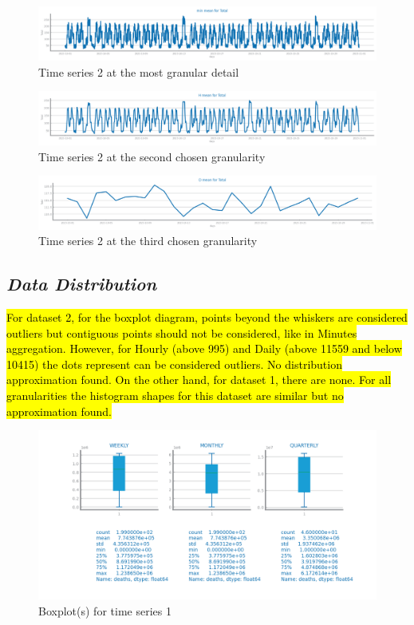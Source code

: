 \documentclass[10pt]{extarticle}
\newcommand{\ctext}[3][RGB]{%
  \begingroup
  \definecolor{hlcolor}{#1}{#2}\sethlcolor{hlcolor}%
  \hl{#3}%
  \endgroup
}
\begin{document}
\begin{figure}[H]
\centering\includegraphics[scale=0.5]{images/dataset2/time_series/fts_granularity_min.png}
\caption{Time series 2 at the most granular detail}
\end{figure}

\begin{figure}[H]
\centering\includegraphics[scale=0.5]{images/dataset2/time_series/fts_granularity_H.png}
\caption{Time series 2 at the second chosen granularity}
\end{figure}

\begin{figure}[H]
\centering\includegraphics[scale=0.5]{images/dataset2/time_series/fts_granularity_D.png}
\caption{Time series 2 at the third chosen granularity}
\end{figure}

\subsection*{\textit{Data Distribution}}
\ctext[RGB]{190,190,190}{For dataset 2, for the boxplot diagram, points beyond the whiskers are considered outliers but contiguous points should not be considered, like in Minutes aggregation. However, for Hourly (above 995) and Daily (above 11559 and below 10415) the dots represent can be considered outliers. No distribution approximation found.
On the other hand, for dataset 1, there are none. For all granularities the histogram shapes for this dataset are similar but no approximation found. }

\begin{figure}[H]
\centering\includegraphics[scale=0.80]{images/dataset1/time_series/Covid_distribution_boxplot.png}
\caption{Boxplot(s) for time series 1}
\end{figure}
\end{document}
